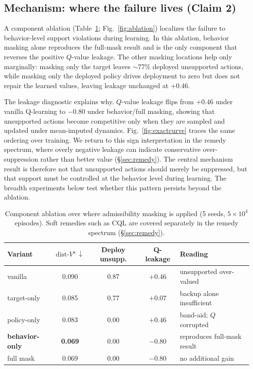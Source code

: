 \documentclass{article}
\newcommand{\dist}{\mathrm{dist}\text{-}V^\star}
\begin{document}
\subsection{Mechanism: where the failure lives (Claim 2)}
\label{sec:mechanism}
A component ablation (Table~\ref{tab:ablation}; Fig.~\ref{fig:ablation})
localizes the failure to behavior-level support violations during learning. In
this ablation, behavior masking alone reproduces the full-mask result and is the
only component that reverses the positive $Q$-value leakage. The other masking locations help
only marginally: masking only the target leaves $\sim$77\% deployed unsupported
actions, while masking only the deployed policy drives deployment to zero but
does not repair the learned values, leaving leakage unchanged at $+0.46$.

The leakage diagnostic explains why. $Q$-value leakage flips from $+0.46$ under
vanilla Q-learning to $-0.80$ under behavior/full masking, showing that
unsupported actions become competitive only when they are sampled and updated
under mean-imputed dynamics. Fig.~\ref{fig:exactcurve} traces the same ordering
over training. We return to this sign interpretation in the remedy spectrum,
where overly negative leakage can indicate conservative over-suppression rather
than better value (\S\ref{sec:remedy}). The central mechanism result is therefore not that
unsupported actions should merely be suppressed, but that support must be
controlled at the behavior level during learning. The breadth experiments below
test whether this pattern persists beyond the ablation.

\begin{table}[t]
\centering
\caption{Component ablation over where admissibility masking is applied
(5 seeds, $5{\times}10^4$ episodes). Soft remedies such as CQL are covered
separately in the remedy spectrum (\S\ref{sec:remedy}).}
\label{tab:ablation}
\begin{tabular}{lcccl}
\toprule
Variant & $\dist\,\downarrow$ & Deploy unsupp. & Q-leakage & Reading \\
\midrule
vanilla            & 0.090 & 0.87 & $+0.46$ & unsupported over-valued \\
target-only        & 0.085 & 0.77 & $+0.07$ & backup alone insufficient \\
policy-only        & 0.083 & 0.00 & $+0.46$ & band-aid; $Q$ corrupted \\
\textbf{behavior-only} & \textbf{0.069} & 0.00 & $-0.80$ & reproduces full-mask result \\
full mask          & 0.069 & 0.00 & $-0.80$ & no additional gain \\
\bottomrule
\end{tabular}
\end{table}
\end{document}
